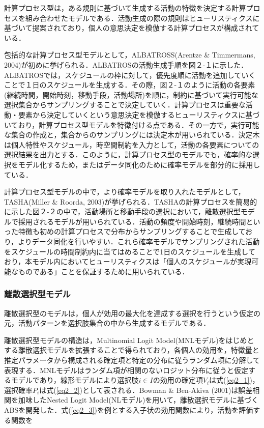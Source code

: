 計算プロセス型は，ある規則に基づいて生成する活動の特徴を決定する計算プロセスを組み合わせたモデルである．活動生成の際の規則はヒューリスティクスに基づいて提案されており，個人の意思決定を模倣する計算プロセスが構成されている．

包括的な計算プロセス型モデルとして，ALBATROSS(Arentze \& Timmermans, 2004)が初めに挙げられる．ALBATROSの活動生成手順を図２-１に示した．ALBATROSでは，スケジュールの枠に対して，優先度順に活動を追加していくことで１日のスケジュールを生成する．その際，図２-１のように活動の各要素(継続時間，開始時刻，移動手段，活動場所)を順に，制約に基づいて実行可能な選択集合からサンプリングすることで決定していく．計算プロセスは重要な活動・要素から決定していくという意思決定を模倣するヒューリスティクスに基づいており，計算プロセス型モデルを特徴付ける点である．その一方で，実行可能な集合の作成と，集合からのサンプリングには決定木が用いられている．決定木は個人特性やスケジュール，時空間制約を入力として，活動の各要素についての選択結果を出力とする．このように，計算プロセス型のモデルでも，確率的な選択をモデル化するため，またはデータ同化のために確率モデルを部分的に採用している．

計算プロセス型モデルの中で，より確率モデルを取り入れたモデルとして，TASHA(Miller \& Roorda, 2003)が挙げられる．TASHAの計算プロセスを簡易的に示した図２-２の中で，活動場所と移動手段の選択において，離散選択型モデルで採用されるモデルが用いられている．活動の頻度や開始時刻，継続時間といった特徴も初めの計算プロセスで分布からサンプリングすることで生成しており，よりデータ同化を行いやすい．これら確率モデルでサンプリングされた活動をスケジュールの時間制約内に当てはめることで1日のスケジュールを生成しており，本モデル内においてヒューリスティクスは「個人のスケジュールが実現可能なものである」ことを保証するために用いられている．

\subsubsection{離散選択型モデル}

離散選択型のモデルは，個人が効用の最大化を達成する選択を行うという仮定の元，活動パターンを選択肢集合の中から生成するモデルである．

離散選択型モデルの構造は，Multinomial Logit Model(MNLモデル)をはじめとする離散選択モデルを拡張することで得られており，各個人の効用を，特徴量と推定パラメータから構成される確定項と特定の分布に従うランダム項に分解して表現する．MNLモデルはランダム項が相関のないロジット分布に従うと仮定するモデルであり，線形モデルにより選択肢$i \in I$の効用の確定項$V_{i}$は式(\ref{eq2_1})，選択確率$P_{i}$は式(\ref{eq2_2})として表される．Bowman \& Ben-Akiva (2001)は誤差相関を加味したNested Logit Model(NLモデル)を用いて，離散選択モデルに基づくABSを開発した．式(\ref{eq2_3})を例とする入子状の効用関数により，活動を評価する関数を

